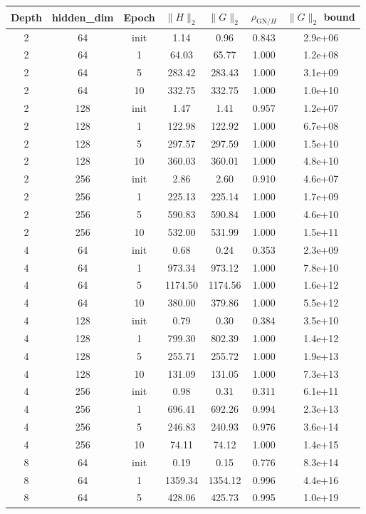 \begin{tabular}{ccccccc}
\toprule
Depth & hidden\_dim & Epoch & $\|H\|_2$ & $\|G\|_2$ & $\rho_{\mathrm{GN}/H}$ & $\|G\|_2$ bound \\
\midrule
2 & 64 & init & 1.14 & 0.96 & 0.843 & 2.9e+06 \\
2 & 64 & 1 & 64.03 & 65.77 & 1.000 & 1.2e+08 \\
2 & 64 & 5 & 283.42 & 283.43 & 1.000 & 3.1e+09 \\
2 & 64 & 10 & 332.75 & 332.75 & 1.000 & 1.0e+10 \\
2 & 128 & init & 1.47 & 1.41 & 0.957 & 1.2e+07 \\
2 & 128 & 1 & 122.98 & 122.92 & 1.000 & 6.7e+08 \\
2 & 128 & 5 & 297.57 & 297.59 & 1.000 & 1.5e+10 \\
2 & 128 & 10 & 360.03 & 360.01 & 1.000 & 4.8e+10 \\
2 & 256 & init & 2.86 & 2.60 & 0.910 & 4.6e+07 \\
2 & 256 & 1 & 225.13 & 225.14 & 1.000 & 1.7e+09 \\
2 & 256 & 5 & 590.83 & 590.84 & 1.000 & 4.6e+10 \\
2 & 256 & 10 & 532.00 & 531.99 & 1.000 & 1.5e+11 \\
4 & 64 & init & 0.68 & 0.24 & 0.353 & 2.3e+09 \\
4 & 64 & 1 & 973.34 & 973.12 & 1.000 & 7.8e+10 \\
4 & 64 & 5 & 1174.50 & 1174.56 & 1.000 & 1.6e+12 \\
4 & 64 & 10 & 380.00 & 379.86 & 1.000 & 5.5e+12 \\
4 & 128 & init & 0.79 & 0.30 & 0.384 & 3.5e+10 \\
4 & 128 & 1 & 799.30 & 802.39 & 1.000 & 1.4e+12 \\
4 & 128 & 5 & 255.71 & 255.72 & 1.000 & 1.9e+13 \\
4 & 128 & 10 & 131.09 & 131.05 & 1.000 & 7.3e+13 \\
4 & 256 & init & 0.98 & 0.31 & 0.311 & 6.1e+11 \\
4 & 256 & 1 & 696.41 & 692.26 & 0.994 & 2.3e+13 \\
4 & 256 & 5 & 246.83 & 240.93 & 0.976 & 3.6e+14 \\
4 & 256 & 10 & 74.11 & 74.12 & 1.000 & 1.4e+15 \\
8 & 64 & init & 0.19 & 0.15 & 0.776 & 8.3e+14 \\
8 & 64 & 1 & 1359.34 & 1354.12 & 0.996 & 4.4e+16 \\
8 & 64 & 5 & 428.06 & 425.73 & 0.995 & 1.0e+19 \\

\end{tabular}
